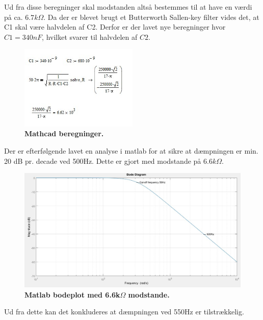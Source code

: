 Ud fra disse beregninger skal modstanden altså bestemmes til at have en værdi på ca. $6.7k\Omega$. Da der er blevet brugt et Butterworth Sallen-key filter vides det, at C1 skal være halvdelen af C2. Derfor er der lavet nye beregninger hvor $C1=340nF$, hvilket svarer til halvdelen af $C2$.
\begin{figure}[H]
\includegraphics[width =0.5\textwidth , center]{billeder/mathcad2}
\caption{\textbf{Mathcad beregninger.}}
\end{figure}
Der er efterfølgende lavet en analyse i matlab for at sikre at dæmpningen er min. 20 dB pr. decade ved 500Hz. Dette er gjort med modstande på $6.6k\Omega$.
\begin{figure}[H]
\includegraphics[width =1.0\textwidth , center]{billeder/bodeplot}
\caption{\textbf{Matlab bodeplot med 6.6k$\Omega$ modstande.}}
\end{figure}
Ud fra dette kan det konkluderes at dæmpningen ved 550Hz er tilstrækkelig.

